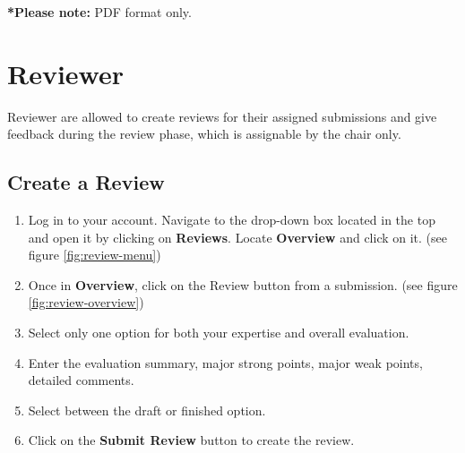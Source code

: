 \documentclass[nochapterpage,nopartpage,noheadingspace,numbersubsubsec,bigchapter,colorback,accentcolor=tud9c,10pt]{tudreport}
\begin{document}
    \textbf{*Please note:} PDF format only.

  \chapter{Reviewer}

    Reviewer are allowed to create reviews for their assigned submissions and give feedback during the review phase, which is assignable by the chair only.

  \section{Create a Review}
        \begin{enumerate}
            \item   Log in to your account. Navigate to the drop-down box located in the top and open it by clicking on \textbf{Reviews}. Locate \textbf{Overview} and click on it. (see figure \ref{fig:review-menu})
            \item   Once in \textbf{Overview}, click on the {Review} button from a submission. (see figure \ref{fig:review-overview})
            \item   Select only one option for both your expertise and overall evaluation.
            \item   Enter the evaluation summary, major strong points, major weak points, detailed comments.
            \item   Select between the draft or finished option.
            \item   Click on the \textbf{Submit Review} button to create the review.
        \end{enumerate}

\end{document}
